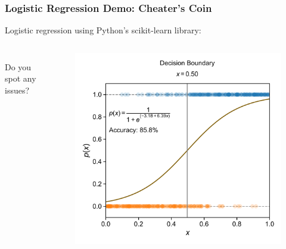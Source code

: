 \documentclass[10pt,aspectratio=169]{beamer}
\begin{document}
      \begin{frame}
        \frametitle{Logistic Regression Demo: Cheater’s Coin}
        Logistic regression using Python's scikit-learn library:
        \vfill
        \begin{columns}[T]
          \begin{column}{0.45\textwidth}
            \inputminted[fontsize=\scriptsize]{python}{sample_lr_coin.py}
            \vfill Do you spot any issues?
          \end{column}

          \begin{column}{0.55\textwidth}
            \vspace{-0.10\textheight}
            \begin{figure}[t]%
              \hspace*{-0.05\textwidth}%
              \includegraphics[width=1.10\textwidth]{scripts/coin_fit_lr.pdf}
            \end{figure}
          \end{column}
        \end{columns}

      \end{frame}

     
\end{document}
